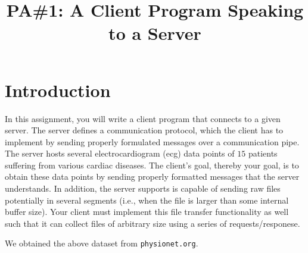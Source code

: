 \documentclass[12pt]{article}
\begin{document}
\title{\vspace{-5ex}PA\#1: A Client Program Speaking to a Server}
\date{\vspace{-10ex}}
\maketitle

\section*{Introduction}
In this assignment, you will write a client program that connects to a given server. The server defines a communication protocol, which the client has to implement by sending properly formulated messages over a communication pipe. The server hosts  several electrocardiogram (ecg) data points of $15$ patients suffering from various cardiac diseases. The client's goal, thereby your goal, is to obtain these data points by sending properly formatted messages that the server understands. In addition, the server supports is capable of sending raw files potentially in several segments (i.e., when the file is larger than some internal buffer size). Your client must implement this file transfer functionality as well such that it can collect files of arbitrary size using a series of requests/responese.

We obtained the above dataset from \texttt{physionet.org}.
	
\end{document}
